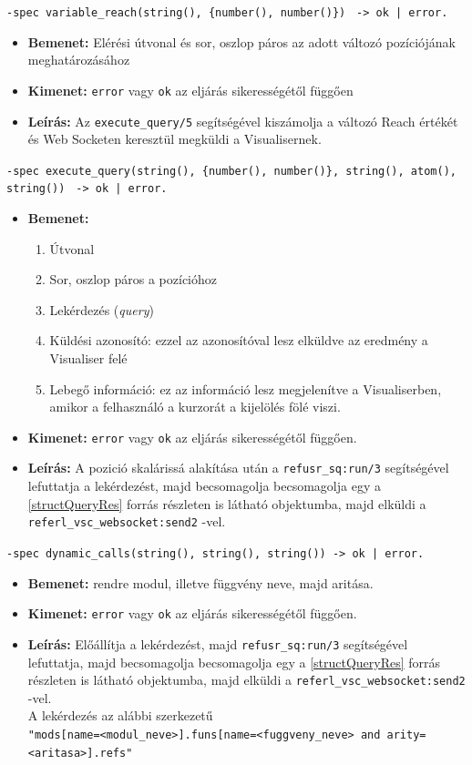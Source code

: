    
    \noindent \lstinline|-spec variable_reach(string(), {number(), number()})| \lstinline{ -> ok | error.}
    \begin{itemize}
        \item \textbf{Bemenet:} Elérési útvonal és sor, oszlop páros az adott változó pozíciójának meghatározásához
        \item \textbf{Kimenet:} \lstinline{error} vagy \lstinline{ok} az eljárás sikerességétől függően
        \item \textbf{Leírás:} Az \lstinline{execute_query/5} segítségével kiszámolja a változó Reach értékét és Web Socketen keresztül megküldi a Visualisernek.
    \end{itemize}
    \noindent \lstinline|-spec execute_query(string(), {number(), number()}, string(), atom(), string())| \lstinline{ -> ok | error.}
    \begin{itemize}
        \item \textbf{Bemenet:}
        \begin{enumerate}
            \item Útvonal
            \item Sor, oszlop páros a pozícióhoz
            \item Lekérdezés (\textit{query})
            \item Küldési azonosító: ezzel az azonosítóval lesz elküldve az eredmény a Visualiser felé
            \item Lebegő információ: ez az információ lesz megjelenítve a Visualiserben, amikor a felhasználó a kurzorát a kijelölés fölé viszi.
        \end{enumerate}
        \item \textbf{Kimenet:} \lstinline{error} vagy \lstinline{ok} az eljárás sikerességétől függően.
        \item \textbf{Leírás:} A pozició skalárissá alakítása után a \lstinline{refusr_sq:run/3} segítségével lefuttatja a lekérdezést, majd becsomagolja becsomagolja egy a \ref{structQueryRes} forrás részleten is látható objektumba, majd elküldi a \lstinline{referl_vsc_websocket:send2}  -vel.
    \end{itemize}
    


    \noindent \lstinline{-spec dynamic_calls(string(), string(), string()) -> ok | error.}
    \begin{itemize}
        \item \textbf{Bemenet:} rendre modul, illetve függvény neve, majd aritása.
        \item \textbf{Kimenet:} \lstinline{error} vagy \lstinline{ok} az eljárás sikerességétől függően.
        \item \textbf{Leírás:} Előállítja a lekérdezést, majd \lstinline{refusr_sq:run/3} segítségével lefuttatja, majd becsomagolja becsomagolja egy a \ref{structQueryRes} forrás részleten is látható objektumba, majd elküldi a \lstinline{referl_vsc_websocket:send2} -vel. \\
        A lekérdezés az alábbi szerkezetű \\ 
        \lstinline{"mods[name=<modul_neve>].funs[name=<fuggveny_neve> and arity=<aritasa>].refs"}
    \end{itemize}
    
